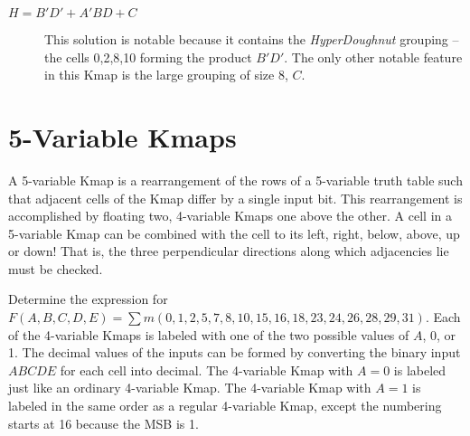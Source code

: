\begin{changemargin}{1.5cm}{1.5cm}
\begin{description}
\item [$H=B'D'+A'BD+C$]
    This solution is notable because it contains the
    \textit{HyperDoughnut}  grouping -- the cells
    0,2,8,10 forming the product $B'D'$.  The only other notable
    feature in this Kmap is the large grouping of size 8, $C$.
\end{description}
\end{changemargin}

\section{5-Variable Kmaps}
A 5-variable Kmap is a rearrangement of the rows of a 5-variable
truth table such that adjacent cells of the Kmap differ by a single
input bit.  This rearrangement is accomplished by floating two, 4-variable
Kmaps one above the other.  A cell in a 5-variable Kmap can be combined with
the cell to its left, right, below, above, up or down!  That is, the three
perpendicular directions along which adjacencies lie must be checked.

Determine the \SOPmin expression for \\
$F(A,B,C,D,E) = \sum m(0,1,2,5,7,8,10,15,16,18,23,24,26,28,29,31)$.
Each of the 4-variable Kmaps is labeled with one of the two possible
values of $A$, 0, or 1.  The decimal values of the inputs can be formed
by converting the binary input $ABCDE$ for each cell into decimal.  The
4-variable Kmap with $A=0$ is labeled just like an ordinary 4-variable
Kmap.  The 4-variable Kmap with $A=1$ is labeled in the same order as a
regular 4-variable Kmap, except the numbering starts at 16 because the MSB
is 1.

